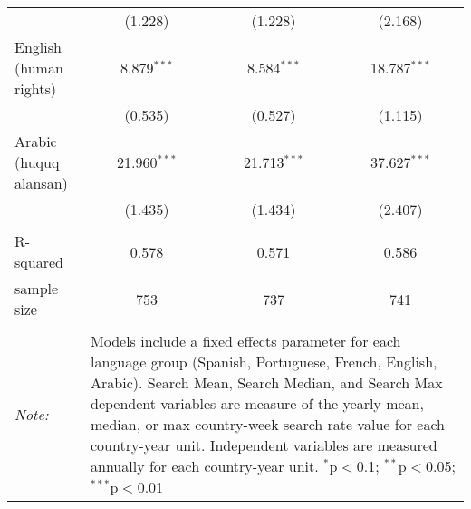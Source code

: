 \begin{table}[!htbp]
\begin{tabular}{@{\extracolsep{5pt}}lccc}
  & (1.228) & (1.228) & (2.168) \\ 
  English (human rights) & 8.879$^{***}$ & 8.584$^{***}$ & 18.787$^{***}$ \\ 
  & (0.535) & (0.527) & (1.115) \\ 
  Arabic (huquq alansan) & 21.960$^{***}$ & 21.713$^{***}$ & 37.627$^{***}$ \\ 
  & (1.435) & (1.434) & (2.407) \\ 
 \hline \\[-1.8ex] 
R-squared  & 0.578 & 0.571 & 0.586 \\ 
sample size  & 753 & 737 & 741 \\ 
\hline 
\hline \\[-1.8ex] 
\textit{Note:}  & \multicolumn{3}{l}{\parbox[t]{8cm}{Models include a fixed effects parameter for each language group (Spanish, Portuguese, French, English, Arabic). Search Mean, Search Median, and Search Max dependent variables are measure of the yearly mean, median, or max country-week search rate value for each country-year unit. Independent variables are measured annually for each country-year unit. $^{*}$p$<$0.1; $^{**}$p$<$0.05; $^{***}$p$<$0.01}} \\ 
\end{tabular} 
\end{table} 
